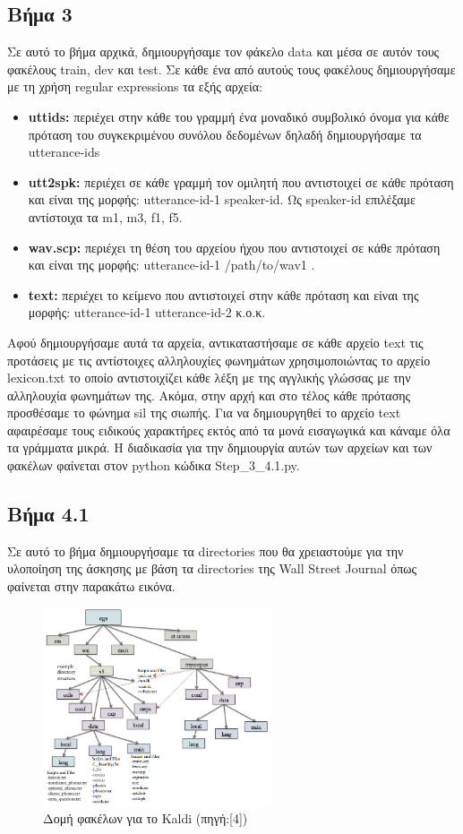\documentclass[12pt]{article}
\begin{document}
\subsection*{Βήμα 3}
Σε αυτό το βήμα αρχικά, δημιουργήσαμε τον φάκελο data και μέσα σε αυτόν τους φακέλους train, dev και test. Σε κάθε ένα από αυτούς τους φακέλους δημιουργήσαμε με τη χρήση regular expressions τα εξής αρχεία: 
\begin{itemize}
    \item \textbf{uttids:} περιέχει στην κάθε του γραμμή ένα μοναδικό συμβολικό όνομα για κάθε πρόταση του συγκεκριμένου συνόλου δεδομένων δηλαδή δημιουργήσαμε τα  utterance-ids
    \item \textbf{utt2spk:} περιέχει σε κάθε γραμμή τον ομιλητή που αντιστοιχεί σε κάθε πρόταση και είναι της μορφής: utterance-id-1 speaker-id. Ως speaker-id επιλέξαμε αντίστοιχα τα m1, m3, f1, f5.  
    \item \textbf{wav.scp:} περιέχει τη θέση του αρχείου ήχου που αντιστοιχεί σε κάθε πρόταση και είναι της μορφής: utterance-id-1 /path/to/wav1 .
    \item \textbf{text:} περιέχει το κείμενο που αντιστοιχεί στην κάθε πρόταση και είναι της μορφής: utterance-id-1 utterance-id-2 κ.ο.κ.
\end{itemize}
Αφού δημιουργήσαμε αυτά τα αρχεία, αντικαταστήσαμε σε κάθε αρχείο text τις προτάσεις με τις αντίστοιχες αλληλουχίες φωνημάτων χρησιμοποιώντας το αρχείο lexicon.txt το οποίο αντιστοιχίζει κάθε λέξη με της αγγλικής γλώσσας με την αλληλουχία φωνημάτων της. Ακόμα, στην αρχή και στο τέλος κάθε πρότασης προσθέσαμε το φώνημα sil της σιωπής.
Για να δημιουργηθεί το αρχείο text αφαιρέσαμε τους ειδικούς χαρακτήρες εκτός από τα μονά εισαγωγικά και κάναμε όλα τα γράμματα μικρά. Η διαδικασία για την δημιουργία αυτών των αρχείων και των φακέλων φαίνεται στον python κώδικα Step\_3\_4.1.py.

\subsection*{Βήμα 4.1}
Σε αυτό το βήμα δημιουργήσαμε τα directories που θα χρειαστούμε για την υλοποίηση της άσκησης με βάση τα directories της Wall Street Journal όπως φαίνεται στην παρακάτω εικόνα. 

\begin{figure}[h]
\caption{Δομή φακέλων για το Kaldi (πηγή:[4])}
\centering
\includegraphics[width=0.6\textwidth]{directorystructure2.png}
\end{figure}
\end{document}

